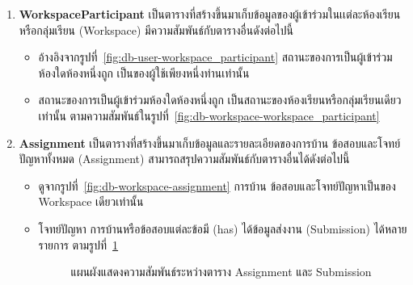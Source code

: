 \documentclass[12pt,oneside,openright,a4paper]{cpe-thai-project}
\begin{document}
\begin{enumerate}
        \item \textbf{WorkspaceParticipant}
            เป็นตารางที่สร้างขึ้นมาเก็บข้อมูลของผู้เข้าร่วมในเเต่ละห้องเรียนหรือกลุ่มเรียน (Workspace) มีความสัมพันธ์กับตารางอื่นดังต่อไปนี้
                \begin{itemize}
                    \item อ้างอิงจากรูปที่~\ref{fig:db-user-workspace_participant} สถานะของการเป็นผู้เข้าร่วมห้องใดห้องหนึ่งถูก เป็นของผู้ใช้เพียงหนึ่งท่านเท่านั้น
                    \item สถานะของการเป็นผู้เข้าร่วมห้องใดห้องหนึ่งถูก เป็นสถานะของห้องเรียนหรือกลุ่มเรียนเดียวเท่านั้น ตามความสัมพันธ์ในรูปที่~\ref{fig:db-workspace-workspace_participant}
                \end{itemize}
        \item \textbf{Assignment}
            เป็นตารางที่สร้างขึ้นมาเก็บข้อมูลและรายละเอียดของการบ้าน ข้อสอบและโจทย์ปัญหาทั้งหมด (Assignment) สามารถสรุปความสัมพันธ์กับตารางอื่นได้ดังต่อไปนี้
                \begin{itemize}
                    \item ดูจากรูปที่~\ref{fig:db-workspace-assignment} การบ้าน ข้อสอบและโจทย์ปัญหาเป็นของ Workspace เดียวเท่านั้น
                    \item โจทย์ปัญหา การบ้านหรือข้อสอบแต่ละข้อมี (has) ได้ข้อมูลส่งงาน (Submission) ได้หลายรายการ ตามรูปที่~\ref{fig:db-assignment-submission}
                    \begin{figure}[H]
                        \centering 
                        \caption[แผนผังแสดงความสัมพันธ์ระหว่างตาราง Assignment และ Submission]{แผนผังแสดงความสัมพันธ์ระหว่างตาราง Assignment และ Submission}
                        \label{fig:db-assignment-submission}

\end{figure}
\end{itemize}
\end{enumerate}
\end{document}
